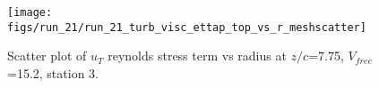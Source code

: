 \begin{figure}[H]
\centering
\texttt{[image: figs/run\_21/run\_21\_turb\_visc\_ettap\_top\_vs\_r\_meshscatter]}
\caption{Scatter plot of $
u_T$ reynolds stress term vs radius at $z/c$=7.75, $V_{free}$=15.2, station 3.}
\label{fig:run_21_turb_visc_ettap_top_vs_r_meshscatter}
\end{figure}


